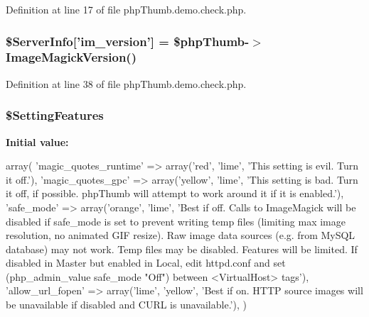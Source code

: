 \-Definition at line 17 of file php\-Thumb.\-demo.\-check.\-php.

\hypertarget{php_thumb_8demo_8check_8php_ad1f321ab5b4c67d74022713a2273b02c}{
\subsubsection[{\$\-Server\-Info}]{\setlength{\rightskip}{0pt plus 5cm}\$\-Server\-Info\mbox{[}'im\-\_\-version'\mbox{]} = \$php\-Thumb-\/$>$\-Image\-Magick\-Version()}}\label{php_thumb_8demo_8check_8php_ad1f321ab5b4c67d74022713a2273b02c}


\-Definition at line 38 of file php\-Thumb.\-demo.\-check.\-php.

\hypertarget{php_thumb_8demo_8check_8php_a3221b39580482af846709d68ada2832e}{
\subsubsection[{\$\-Setting\-Features}]{\setlength{\rightskip}{0pt plus 5cm}\$\-Setting\-Features}}\label{php_thumb_8demo_8check_8php_a3221b39580482af846709d68ada2832e}
{\bfseries \-Initial value\-:}
\begin{DoxyCode}
 array(
        'magic_quotes_runtime' => array('red',    'lime',   'This setting is
       evil. Turn it off.'),
        'magic_quotes_gpc'     => array('yellow', 'lime',   'This setting is
       bad. Turn it off, if possible. phpThumb will attempt to work around it if it is
       enabled.'),
        'safe_mode'            => array('orange', 'lime',   'Best if off. Calls
       to ImageMagick will be disabled if safe_mode is set to prevent writing temp
       files (limiting max image resolution, no animated GIF resize). Raw image data
       sources (e.g. from MySQL database) may not work. Temp files may be disabled. Features
       will be limited. If disabled in Master but enabled in Local, edit httpd.conf
       and set (php_admin_value safe_mode "Off") between <VirtualHost> tags'),
        'allow_url_fopen'      => array('lime',   'yellow', 'Best if on. HTTP
       source images will be unavailable if disabled and CURL is unavailable.'),
)
\end{DoxyCode}


